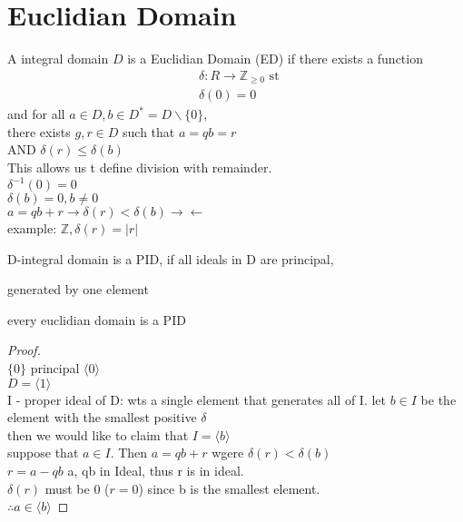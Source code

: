 \documentclass{article}
\begin{document}
\section{Euclidian Domain}
A integral domain  $D$ is a Euclidian Domain (ED) if there exists a function \begin{align*}
    &\delta: R \to \mathbb{Z}_{\geq 0}  \text { st } \\ 
    & \delta(0) = 0
\end{align*}
and for all $a \in D, b \in D^* = D \backslash \{0\}$, \\  there exists $g, r \in  D$ such that $a = qb = r$  \\ AND $\delta(r) \leq \delta(b)$ \\ 

 This allows us t define division with remainder. \\
$\delta^{-1}(0) = 0$
 \\ $\delta(b) = 0, b \not = 0$ \\ 
 $a = qb + r \rightarrow \delta (r) < \delta(b) \rightarrow \leftarrow$  \\ 
 example: $\mathbb{Z}, \delta(r) =|r| $ \\

 
 \begin{definition}[PID]
    D-integral domain is a PID, if all ideals in D are principal, 

    generated by one element 
 \end{definition}

 \begin{proposition}
    every euclidian domain is a PID 
 \end{proposition}
 \begin{proof} \leavevmode \\ 
    $\{0\}$ principal $\langle 0 \rangle$  \\ 
    $D = \langle 1 \rangle$ \\ 
    I - proper ideal of D: wts a single element that generates all of I. let $b \in I$ be the element with the smallest positive $\delta$ \\ 
    then we would like to claim that $I = \langle b \rangle$ \\ 

    suppose that $a \in I$. Then $a = qb +r$ wgere $\delta(r) < \delta(b)$ \\ 
    $r = a -   qb$ a, qb in Ideal, thus r is in ideal. 
    \\ $\delta(r)$ must be 0 ($ r = 0$) since b is the smallest element.   \\ 
    $\therefore a\in \langle b \rangle$ 
 \end{proof}
\end{document}
